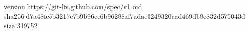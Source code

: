 version https://git-lfs.github.com/spec/v1
oid sha256:d7a48fe5b3217c7b9b96ce6b96288af7adae0249320aad469db8e832d575043d
size 319752
